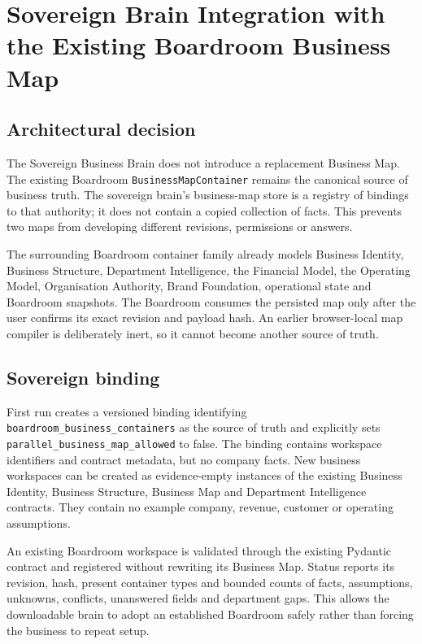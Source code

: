 \section{Sovereign Brain Integration with the Existing Boardroom Business Map}
\label{sec:sovereign-boardroom-business-map}

\subsection{Architectural decision}

The Sovereign Business Brain does not introduce a replacement Business Map.
The existing Boardroom \texttt{BusinessMapContainer} remains the canonical source
of business truth.  The sovereign brain's business-map store is a registry of
bindings to that authority; it does not contain a copied collection of facts.
This prevents two maps from developing different revisions, permissions or
answers.

The surrounding Boardroom container family already models Business Identity,
Business Structure, Department Intelligence, the Financial Model, the Operating
Model, Organisation Authority, Brand Foundation, operational state and
Boardroom snapshots.  The Boardroom consumes the persisted map only after the
user confirms its exact revision and payload hash.  An earlier browser-local
map compiler is deliberately inert, so it cannot become another source of
truth.

\subsection{Sovereign binding}

First run creates a versioned binding identifying
\texttt{boardroom\_business\_containers} as the source of truth and explicitly
sets \texttt{parallel\_business\_map\_allowed} to false.  The binding contains
workspace identifiers and contract metadata, but no company facts.  New
business workspaces can be created as evidence-empty instances of the existing
Business Identity, Business Structure, Business Map and Department
Intelligence contracts.  They contain no example company, revenue, customer or
operating assumptions.

An existing Boardroom workspace is validated through the existing Pydantic
contract and registered without rewriting its Business Map.  Status reports its
revision, hash, present container types and bounded counts of facts,
assumptions, unknowns, conflicts, unanswered fields and department gaps.  This
allows the downloadable brain to adopt an established Boardroom safely rather
than forcing the business to repeat setup.

